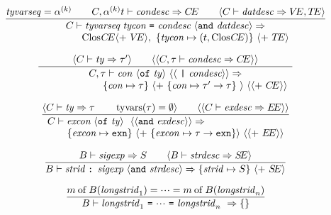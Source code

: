 \begin{equation}         %
\label{datdesc-rule}
\frac{ \tyvarseq = \alphak\qquad\C,\alphakt\ts\condesc\ra\CE
       \qquad\langle\C\ts\datdesc\ra\VE,\TE\rangle }
     { \begin{array}{cl}
       \C\ts\datdescription\ra\\
       \qquad\qquad\cl{}{\CE}\langle +\ \VE\rangle,\
       \{\tycon\mapsto(t,\cl{}{\CE})\}\ \langle +\ \TE\rangle
       \end{array}
     }\index{43.3}
\end{equation}

\begin{equation}         %
\frac{\langle\C\ts\ty\ra\tau'\rangle\qquad
      \langle\langle\C,\tau\ts\condesc\ra\CE\rangle\rangle }
     {\begin{array}{c}
      \C,\tau\ts\longcondescription\ra\\
      \qquad\qquad\qquad\{\con\mapsto\tau\}\
     \langle +\ \{\con\mapsto\tau'\to\tau\}\ \rangle\
      \langle\langle +\ \CE\rangle\rangle
      \end{array}
     }\index{43.35}
\end{equation}

\begin{equation}         %
\label{exndesc-rule}
\frac{ \langle\C\ts\ty\ra\tau\qquad\TyVarsFcn(\tau)=\emptyset\rangle\qquad
       \langle\langle\C\ts\exndesc\ra\EE\rangle\rangle }
     { \begin{array}{l}
        \C\ts\exndescriptiona\ra\\
        \quad\quad\{\exn\mapsto\EXCN\}\ \langle +\ \{\exn\mapsto\tau\rightarrow\EXCN\}\rangle\ \langle\langle +\ \EE\rangle\rangle 
       \end{array}
     }\index{43.4}
\end{equation}

\begin{equation}
\label{strdesc-rule}
\frac{ \B\ts\sigexp\ra\S\qquad\langle\B\ts\strdesc\ra\SE\rangle }
     { \B\ts\strdescription\ra\{\strid\mapsto\S\}\ \langle +\ \SE\rangle }\index{43.5}
\end{equation}


\begin{equation}          %
\label{strshareq-rule}
\frac{ \of{\m}{\B(\longstrid_1)}=\cdots =\of{\m}{\B(\longstrid_n)} }
     { \B\ts\strshareq\ra\emptymap }\index{44.1}
\end{equation}

